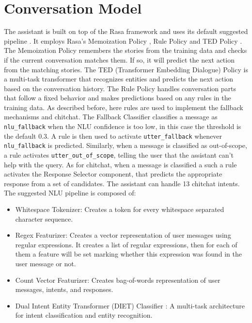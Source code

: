 \documentclass[journal, 11pt]{IEEEtran}
\begin{document}
\section{Conversation Model}
\label{sec:pipeline}
The assistant is built on top of the Rasa framework and uses its default suggested pipeline \cite{rasasuggestedconf}. It employs Rasa's Memoization Policy \cite{rasamempol}, Rule Policy \cite{rasarulepol} and TED Policy \cite{rasated}.
The Memoization Policy remembers the stories from the training data and checks if the current conversation matches them. If so, it will predict the next action from the matching stories.
The TED (Transformer Embedding Dialogue) Policy is a multi-task transformer \cite{tedpol} that recognizes entities and predicts the next action based on the conversation history.
The Rule Policy handles conversation parts that follow a fixed behavior and makes predictions based on any rules in the training data. As described before, here rules are used to implement the fallback mechanisms and chitchat.
The Fallback Classifier \cite{rasafallbackclassf} classifies a message as \texttt{nlu\_fallback} when the NLU confidence is too low, in this case the threshold is the default 0.3.
A rule is then used to activate \texttt{utter\_fallback} whenever \texttt{nlu\_fallback} is predicted.
Similarly, when a message is classified as out-of-scope, a rule activates \texttt{utter\_out\_of\_scope}, telling the user that the assistant can't help with the query.
As for chitchat, when a message is classified a such a rule activates the Response Selector \cite{responsesel} component, that predicts the appropriate response from a set of candidates. The assistant can handle 13 chitchat intents.
The suggested NLU pipeline is composed of:

\begin{itemize}
    \item Whitespace Tokenizer: Creates a token for every whitespace separated character sequence.
    \item Regex Featurizer: Creates a vector representation of user messages using regular expressions. It creates a list of regular expressions, then for each of them a feature will be set marking whether this expression was found in the user message or not.
    \item Count Vector Featurizer: Creates bag-of-words representation of user messages, intents, and responses.
    \item Dual Intent Entity Transformer (DIET) Classifier \cite{diet}: A multi-task architecture for intent classification and entity recognition.
\end{itemize}
\end{document}

